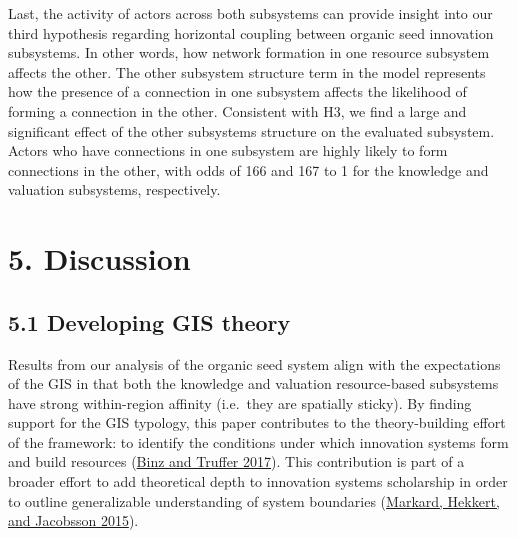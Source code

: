 \documentclass[twoside,12pt,final]{ucthesis-CA2012}
\begin{document}
\begin{ucmainmatter}
Last, the activity of actors across both subsystems can provide insight
into our third hypothesis regarding horizontal coupling between organic
seed innovation subsystems. In other words, how network formation in one
resource subsystem affects the other. The \textquotesingle other subsystem structure\textquotesingle{}
term in the model represents how the presence of a connection in one
subsystem affects the likelihood of forming a connection in the other.
Consistent with H3, we find a large and significant effect of the other
subsystems\textquotesingle{} structure on the evaluated subsystem. Actors who have
connections in one subsystem are highly likely to form connections in
the other, with odds of 166 and 167 to 1 for the knowledge and valuation
subsystems, respectively.

\hypertarget{discussion}{%
\section{5. Discussion}\label{discussion}}

\hypertarget{developing-gis-theory}{%
\subsection{5.1 Developing GIS theory}\label{developing-gis-theory}}

Results from our analysis of the organic seed system align with the
expectations of the GIS in that both the knowledge and valuation
resource-based subsystems have strong within-region affinity (i.e.~they
are spatially sticky). By finding support for the GIS typology, this
paper contributes to the theory-building effort of the framework: to
identify the conditions under which innovation systems form and build
resources
(\protect\hyperlink{ref-Binz_Truffer_2017}{Binz and Truffer 2017}). This
contribution is part of a broader effort to add theoretical depth to
innovation systems scholarship in order to outline generalizable
understanding of system boundaries
(\protect\hyperlink{ref-Markard_Hekkert_Jacobsson_2015}{Markard, Hekkert, and Jacobsson 2015}).


\end{ucmainmatter}
\end{document}
